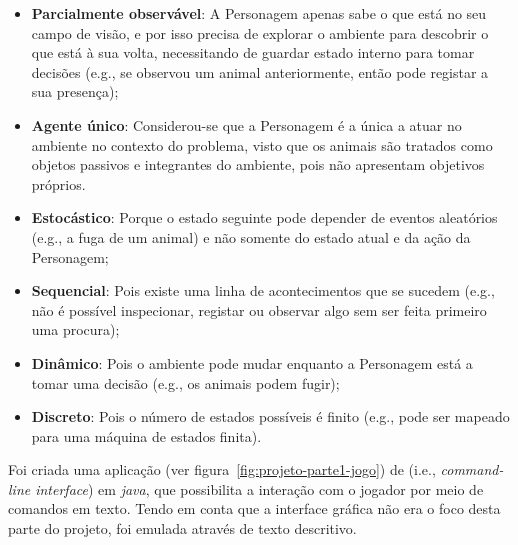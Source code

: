 \begin{itemize}
    \item \textbf{Parcialmente observável}: A Personagem apenas sabe o que está no seu campo de visão, e por isso precisa de explorar o ambiente para descobrir o que está à sua volta, necessitando de guardar estado interno para tomar decisões (e.g., se observou um animal anteriormente, então pode registar a sua presença);
    \item \textbf{Agente único}: Considerou-se que a Personagem é a única a atuar no ambiente no contexto do problema, visto que os animais são tratados como objetos passivos e integrantes do ambiente, pois não apresentam objetivos próprios.
    \item \textbf{Estocástico}: Porque o estado seguinte pode depender de eventos aleatórios (e.g., a fuga de um animal) e não somente do estado atual e da ação da Personagem;
    \item \textbf{Sequencial}: Pois existe uma linha de acontecimentos que se sucedem (e.g., não é possível inspecionar, registar ou observar algo sem ser feita primeiro uma procura);
    \item \textbf{Dinâmico}: Pois o ambiente pode mudar enquanto a Personagem está a tomar uma decisão (e.g., os animais podem fugir);
    \item \textbf{Discreto}: Pois o número de estados possíveis é finito (e.g., pode ser mapeado para uma máquina de estados finita).
\end{itemize}

Foi criada uma aplicação (ver figura~\ref{fig:projeto-parte1-jogo}) de  (i.e., \textit{command-line interface}) em \textit{java}, que possibilita a interação com o jogador por meio de comandos em texto.
Tendo em conta que a interface gráfica não era o foco desta parte do projeto, foi emulada através de texto descritivo.

